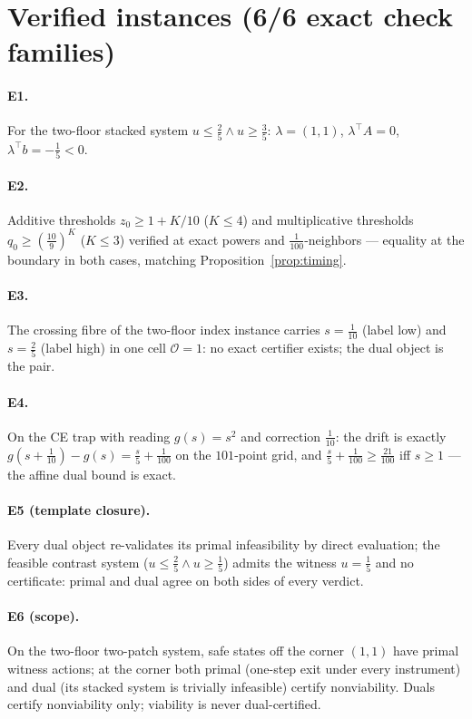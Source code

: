 \documentclass[10pt,twocolumn]{article}
\theoremstyle{definition}
\begin{document}
\section{Verified instances (6/6 exact check families)}

\paragraph{E1.} For the two-floor stacked system $u\le\tfrac25\wedge
u\ge\tfrac35$: $\lambda=(1,1)$, $\lambda^{\top}A=0$,
$\lambda^{\top}b=-\tfrac15<0$.

\paragraph{E2.} Additive thresholds $z_0\ge1+K/10$ ($K\le4$) and
multiplicative thresholds $q_0\ge(\tfrac{10}9)^K$ ($K\le3$) verified at
exact powers and $\tfrac1{100}$-neighbors --- equality at the boundary in
both cases, matching Proposition~\ref{prop:timing}.

\paragraph{E3.} The crossing fibre of the two-floor index instance carries
$s=\tfrac1{10}$ (label low) and $s=\tfrac25$ (label high) in one cell
$\mathcal O=1$: no exact certifier exists; the dual object is the pair.

\paragraph{E4.} On the CE trap with reading $g(s)=s^2$ and correction
$\tfrac1{10}$: the drift is exactly $g(s+\tfrac1{10})-g(s)=\tfrac{s}5+
\tfrac1{100}$ on the $101$-point grid, and $\tfrac{s}5+\tfrac1{100}\ge
\tfrac{21}{100}$ iff $s\ge1$ --- the affine dual bound is exact.

\paragraph{E5 (template closure).} Every dual object re-validates its
primal infeasibility by direct evaluation; the feasible contrast system
($u\le\tfrac25\wedge u\ge\tfrac15$) admits the witness $u=\tfrac15$ and no
certificate: primal and dual agree on both sides of every verdict.

\paragraph{E6 (scope).} On the two-floor two-patch system, safe states off
the corner $(1,1)$ have primal witness actions; at the corner both primal
(one-step exit under every instrument) and dual (its stacked system is
trivially infeasible) certify nonviability. Duals certify nonviability
only; viability is never dual-certified.
\end{document}
